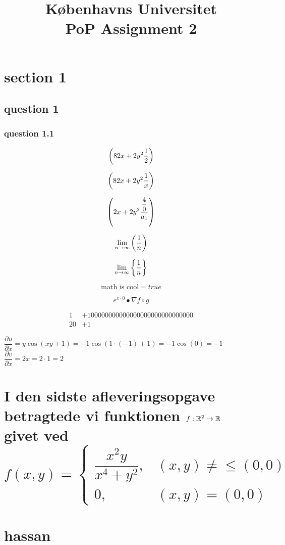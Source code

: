 \documentclass[a4paper,12pt]{article}
\begin{document}
% 

\title{Københavns Universitet\\
PoP Assignment 2}
\maketitle %

\section{section 1}

\subsection[allah er stor]{question 1}

\subsubsection[yeet]{question 1.1}

\[
\left( 82x+2y^2\frac{1}{2}\right)
\]

\[
\left( 82x+2y^2\frac{1}{x}\right)
\]

\[
\left( 2x+2y^2\dfrac{\dfrac{4}{0}}{a_{1}}\right)
\]

\[
\lim_{n \to \infty}\left( \dfrac{1}{n}\right)
\]

\[
\lim_{n \to \infty}\left\{ \dfrac{1}{n}\right\}
\]

\[
\text{math is cool} = true
\]

\[
e^{x\cdot0}\bullet\nabla f\circ g 
\]

\[
\begin{aligned}
1&+100000000000000000000000000000\\
20&+1
\end{aligned}
\]

$\dfrac{\partial u}{\partial x} = y\cos(xy+1) = -1\cos(1\cdot(-1)+1) = -1\cos(0) = -1$\\
$\dfrac{\partial v}{\partial x} = 2x = 2\cdot1 = 2$


\section[]{I den sidste afleveringsopgave betragtede vi funktionen $f: \mathbb{R}^2 \to \mathbb{R}$ givet ved
\[
f(x,y) = \begin{cases}
    \dfrac{x^2 y}{x^4 + y^2}, & (x,y) \neq \leq (0,0) \\
    0, & (x,y) = (0,0)
\end{cases}
\]
\\hassan}
\end{document}

